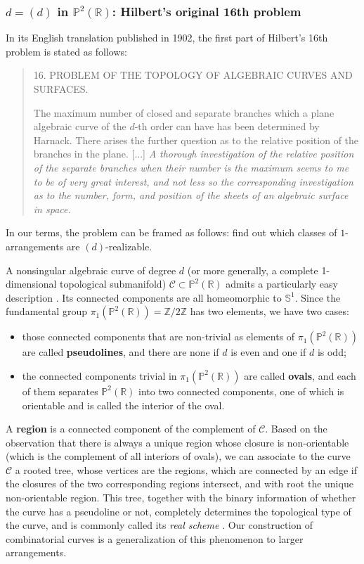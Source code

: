 \documentclass[11pt,reqno]{amsart}
\theoremstyle{plain}
\theoremstyle{definition}
\theoremstyle{remark}
\numberwithin{equation}{subsection}
\newcommand*{\bbP}{\mathbb{P}}
\newcommand*{\bbR}{\mathbb{R}}
\newcommand*{\bbS}{\mathbb{S}}
\newcommand*{\bbZ}{\mathbb{Z}}
\newcommand*{\calC}{\mathcal{C}}
\begin{document}
\subsubsection{$d=(d)$ in $\bbP^2(\bbR)$: Hilbert's original 16th problem}\label{subsubsec:original}

In its English translation published \cite{hilbert} in 1902, the first part of Hilbert's 16th problem is stated as follows:

\begin{quote}
    16. PROBLEM OF THE TOPOLOGY OF ALGEBRAIC CURVES AND SURFACES.
    
    The maximum number of closed and separate branches which a plane algebraic curve of the $d$-th order can have has been determined by Harnack. There arises the further question as to the relative position of the branches in the plane. [...] \textit{A thorough investigation of the relative position of the separate branches when their number is the maximum seems to me to be of very great interest, and not less so the corresponding investigation as to the number, form, and position of the sheets of an algebraic surface in space.}
\end{quote}

In our terms, the problem can be framed as follows: find out which classes of $1$-arrangements are $(d)$-realizable.

A nonsingular algebraic curve of degree $d$ (or more generally, a complete 1-dimensional topological submanifold) $\calC\subset\bbP^2(\bbR)$ admits a particularly easy description \cite{wilson1978hilbert}. Its connected components are all homeomorphic to $\bbS^1$. Since the fundamental group $\pi_1(\bbP^2(\bbR))=\bbZ/2\bbZ$ has two elements, we have two cases:
\begin{itemize}
    \item those connected components that are non-trivial as elements of $\pi_1(\bbP^2(\bbR))$ are called \textbf{pseudolines}, and there are none if $d$ is even and one if $d$ is odd;
    \item the connected components trivial in $\pi_1(\bbP^2(\bbR))$ are called \textbf{ovals}, and each of them separates $\bbP^2(\bbR)$ into two connected components, one of which is orientable and is called the interior of the oval.
\end{itemize}
A \textbf{region} is a connected component of the complement of $\calC$. Based on the observation that there is always a unique region whose closure is non-orientable (which is the complement of all interiors of ovals), we can associate to the curve $\calC$ a rooted tree, whose vertices are the regions, which are connected by an edge if the closures of the two corresponding regions intersect, and with root the unique non-orientable region. This tree, together with the binary information of whether the curve has a pseudoline or not, completely determines the topological type of the curve, and is commonly called its \textit{real scheme} \cite{rokhlin1978complex}. Our construction of combinatorial curves is a generalization of this phenomenon to larger arrangements.
\end{document}

